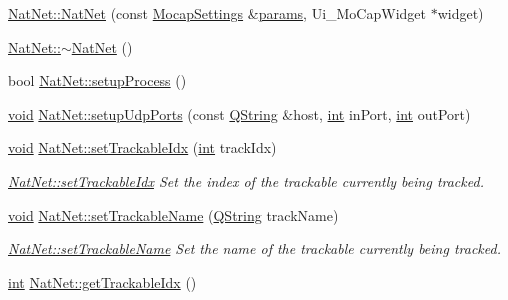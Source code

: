 \begin{DoxyCompactItemize}
\item 
\hyperlink{group__mocap_gaa94c0d1f5d60294b81cdb7d04f50c13e}{Nat\-Net\-::\-Nat\-Net} (const \hyperlink{group___mo_cap_plugin_ga6083347a5b3eb70e360f599354dc0f0b}{Mocap\-Settings} \&\hyperlink{glext_8h_afeb6390ab3bc8a0e96a88aff34d52288}{params}, Ui\-\_\-\-Mo\-Cap\-Widget $\ast$widget)
\item 
\hyperlink{group__mocap_ga119cde1cc51a6b41f0e064565467c398}{Nat\-Net\-::$\sim$\-Nat\-Net} ()
\item 
bool \hyperlink{group__mocap_gaec62d88408f6c898d9cd6b6192b7dec8}{Nat\-Net\-::setup\-Process} ()
\item 
\hyperlink{group___u_a_v_objects_plugin_ga444cf2ff3f0ecbe028adce838d373f5c}{void} \hyperlink{group__mocap_gad51f36a3cda11c275da178b2e55ae688}{Nat\-Net\-::setup\-Udp\-Ports} (const \hyperlink{group___u_a_v_objects_plugin_gab9d252f49c333c94a72f97ce3105a32d}{Q\-String} \&host, \hyperlink{ioapi_8h_a787fa3cf048117ba7123753c1e74fcd6}{int} in\-Port, \hyperlink{ioapi_8h_a787fa3cf048117ba7123753c1e74fcd6}{int} out\-Port)
\item 
\hyperlink{group___u_a_v_objects_plugin_ga444cf2ff3f0ecbe028adce838d373f5c}{void} \hyperlink{group__mocap_ga92f0c84eeffa49fd021a9c5ad837947a}{Nat\-Net\-::set\-Trackable\-Idx} (\hyperlink{ioapi_8h_a787fa3cf048117ba7123753c1e74fcd6}{int} track\-Idx)
\begin{DoxyCompactList}\small\item\em \hyperlink{group__mocap_ga92f0c84eeffa49fd021a9c5ad837947a}{Nat\-Net\-::set\-Trackable\-Idx} Set the index of the trackable currently being tracked. \end{DoxyCompactList}\item 
\hyperlink{group___u_a_v_objects_plugin_ga444cf2ff3f0ecbe028adce838d373f5c}{void} \hyperlink{group__mocap_gac1813312de25d16f42e41c5ffd3ced8c}{Nat\-Net\-::set\-Trackable\-Name} (\hyperlink{group___u_a_v_objects_plugin_gab9d252f49c333c94a72f97ce3105a32d}{Q\-String} track\-Name)
\begin{DoxyCompactList}\small\item\em \hyperlink{group__mocap_gac1813312de25d16f42e41c5ffd3ced8c}{Nat\-Net\-::set\-Trackable\-Name} Set the name of the trackable currently being tracked. \end{DoxyCompactList}\item 
\hyperlink{ioapi_8h_a787fa3cf048117ba7123753c1e74fcd6}{int} \hyperlink{group__mocap_gabf29127f9bdc7e4667b0d495812ec2a0}{Nat\-Net\-::get\-Trackable\-Idx} ()

\end{DoxyCompactItemize}
